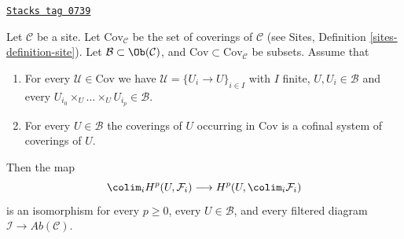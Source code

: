 \begin{lemma}
\label{sites-cohomology-lemma-colim-works-over-collection}
\href{https://stacks.math.columbia.edu/tag/0739}{\texttt{Stacks tag 0739}}

Let $\mathcal{C}$ be a site. Let $\text{Cov}_\mathcal{C}$ be the set
of coverings of $\mathcal{C}$ (see
Sites, Definition \ref{sites-definition-site}). Let
$\mathcal{B} \subset \Ob(\mathcal{C})$, and
$\text{Cov} \subset \text{Cov}_\mathcal{C}$
be subsets. Assume that
\begin{enumerate}
\item For every $\mathcal{U} \in \text{Cov}$ we have
$\mathcal{U} = \{U_i \to U\}_{i \in I}$ with $I$ finite,
$U, U_i \in \mathcal{B}$ and every
$U_{i_0} \times_U \ldots \times_U U_{i_p} \in \mathcal{B}$.
\item For every $U \in \mathcal{B}$ the coverings of $U$
occurring in $\text{Cov}$ is a cofinal system of coverings of $U$.
\end{enumerate}
Then the map
$$
\colim_i H^p(U, \mathcal{F}_i)
\longrightarrow
H^p(U, \colim_i \mathcal{F}_i)
$$
is an isomorphism for every $p \geq 0$, every $U \in \mathcal{B}$, and
every filtered diagram $\mathcal{I} \to \textit{Ab}(\mathcal{C})$.
\end{lemma}

